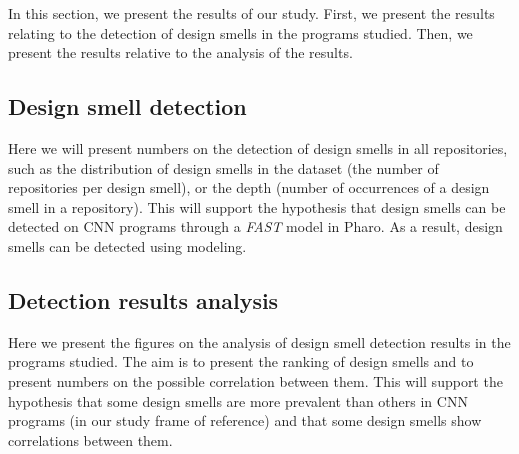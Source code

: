 \label{sec:results}
In this section, we present the results of our study. First, we present the results relating to the detection of design smells in the programs studied. Then, we present the results relative to the analysis of the results.

\subsection{Design smell detection}
\label{sec:results1}
Here we will present numbers on the detection of design smells in all repositories, such as the distribution of design smells in the dataset (the number of repositories per design smell), or the depth (number of occurrences of a design smell in a repository). This will support the hypothesis that design smells can be detected on CNN programs through a \emph{FAST} model in Pharo. As a result, design smells can be detected using modeling.


\subsection{Detection results analysis}
\label{sec:results2}
Here we present the figures on the analysis of design smell detection results in the programs studied. The aim is to present the ranking of design smells and to present numbers on the possible correlation between them. This will support the hypothesis that some design smells are more prevalent than others in CNN programs (in our study frame of reference) and that some design smells show correlations between them.

